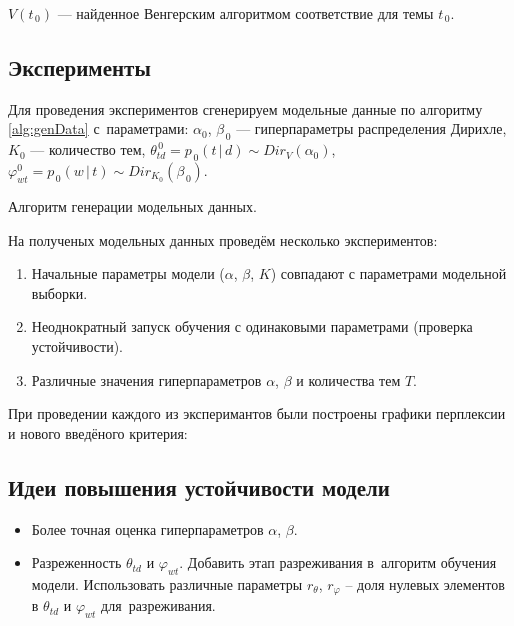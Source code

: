 \documentclass[12pt]{article}
\begin{document}
$\displaystyle V(t_{\,0}) $ --- найденное Венгерским алгоритмом соответствие для темы $ t_{\,0} $.

\subsection{Эксперименты}

Для проведения экспериментов сгенерируем модельные данные по алгоритму \ref{alg:genData} с~параметрами: $ \alpha_0 $, $ \beta_{\,0} $ --- гиперпараметры распределения Дирихле, $ K_0 $ --- количество тем, $ \theta_{td}^{\,0} = p_{\,0}(t\,|\,d) \sim Dir_V(\alpha_0) $, $ \varphi_{wt}^0 = p_{\,0}(w\,|\,t) \sim Dir_{K_0}(\beta_{\,0}) $. 

\begin{algorithm}
\label{alg:genData}
\caption{Алгоритм генерации модельных данных.}
\DontPrintSemicolon


\end{algorithm}


На полученых модельных данных проведём несколько экспериментов:

\begin{enumerate}
  \item Начальные параметры модели ($ \alpha $, $ \beta $, $ K $) совпадают с параметрами модельной выборки.
  \item Неоднократный запуск обучения с одинаковыми параметрами (проверка устойчивости).
  \item Различные значения гиперпараметров $ \alpha $, $ \beta $ и количества тем $ T $.
\end{enumerate}

При проведении каждого из эксперимантов были построены графики перплексии и нового введёного критерия:


\subsection{Идеи повышения устойчивости модели}
\begin{itemize}
  \item Более точная оценка гиперпараметров $ \alpha $, $ \beta $.
  \item Разреженность $ \theta_{td} $ и $ \varphi_{wt} $. 
  Добавить этап разреживания в~алгоритм обучения модели. 
  Использовать различные параметры $ r_\theta $, $ r_\varphi $ -- доля нулевых элементов в $ \theta_{td} $ и $ \varphi_{wt} $ для~разреживания.
\end{itemize}
\end{document}
